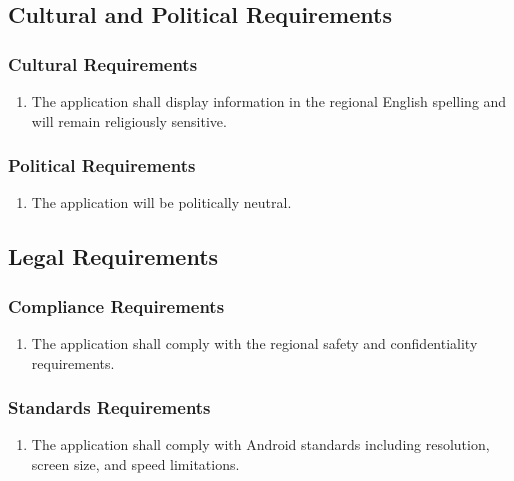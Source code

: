 \documentclass[titlepage]{article}
\begin{document}

\subsection{Cultural and Political Requirements}
\label{sub:cultural_and_political_requirements}

\subsubsection{Cultural Requirements}
\label{ssub:cultural_requirements}
\begin{enumerate}[{CP}1. ]
    \item The application shall display information in the regional English spelling and will remain
    religiously sensitive.
\end{enumerate}

\subsubsection{Political Requirements}
\label{ssub:political_requirements}
\begin{enumerate}[{CP}1. ]
	\item The application will be politically neutral.
\end{enumerate}


\subsection{Legal Requirements}
\label{sub:legal_requirements}

\subsubsection{Compliance Requirements}
\label{ssub:compliance_requirements}
\begin{enumerate}[{LR}1. ]
	\item The application shall comply with the regional safety and confidentiality requirements.
\end{enumerate}

\subsubsection{Standards Requirements}
\label{ssub:standards_requirements}
\begin{enumerate}[{LR}1. ]
    \item The application shall comply with Android standards including resolution, screen size, and
    speed limitations.
\end{enumerate}
\end{document}
